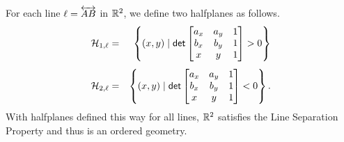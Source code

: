 \begin{prop}\label{prop:rr2-line-sep}
For each line \(\ell = \overleftrightarrow{AB}\) in \(\mathbb{R}^2\), we define two halfplanes as follows.
\begin{eqnarray*}
\mathcal{H}_{1,\ell} & = & \left\{ (x, y) \mid \mathsf{det} \begin{bmatrix} a_x & a_y & 1 \\ b_x & b_y & 1 \\ x & y & 1 \end{bmatrix} > 0 \right\} \\[4pt]
\mathcal{H}_{2,\ell} & = & \left\{ (x, y) \mid \mathsf{det} \begin{bmatrix} a_x & a_y & 1 \\ b_x & b_y & 1 \\ x & y & 1 \end{bmatrix} < 0 \right\}.
\end{eqnarray*}
With halfplanes defined this way for all lines, \(\mathbb{R}^2\) satisfies the Line Separation Property and thus is an ordered geometry.
\end{prop}

